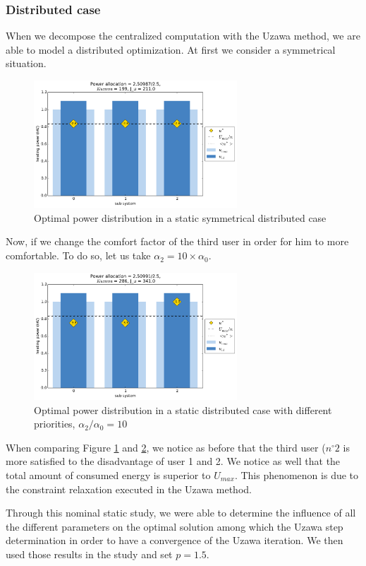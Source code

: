 \documentclass[conference]{IEEEtran}
\begin{document}
\subsubsection{Distributed case}
When we decompose the centralized computation with the Uzawa method, we are able to model a distributed optimization. At first we consider a symmetrical situation.  
\begin{figure}[H]
\centering
\includegraphics[width=3in]{static_DPB_init.pdf}
\caption{Optimal power distribution in a static symmetrical distributed case}
\label{statDPBinit}
\end{figure}

Now, if we change the comfort factor of the third user in order for him to more comfortable. To do so, let us take $\alpha_2 = 10 \times \alpha_0 $.

\begin{figure}[H]
\centering
\includegraphics[width=3in]{static_DPB_cht.pdf}
\caption{Optimal power distribution in a static distributed case with different priorities, $\alpha_2 / \alpha_0 = 10$}
\label{statDPBcom}
\end{figure}
 
 When comparing Figure \ref{statDPBinit} and \ref{statDPBcom}, we notice as before that the third user ($n^{\circ}2$ is more satisfied to the disadvantage of user 1 and 2. We notice as well that the total amount of consumed energy is superior to $U_{max}$. This phenomenon is due to the constraint relaxation executed in the Uzawa method.
 
 Through this nominal static study, we were able to determine the influence of all the different parameters on the optimal solution among which the Uzawa step determination  in order to have a convergence of the Uzawa iteration.  We then used those results in the study and set $p = 1.5$.
 
\end{document}
